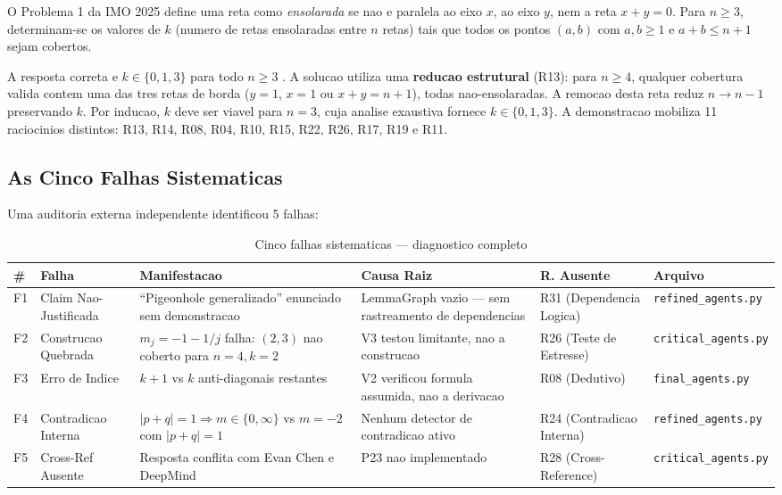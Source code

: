\documentclass[5p]{elsarticle}
\begin{document}
O Problema 1 da IMO 2025 \cite{imo2025} define uma reta como \textit{ensolarada}
se nao e paralela ao eixo $x$, ao eixo $y$, nem a reta $x+y=0$. Para $n\geq 3$,
determinam-se os valores de $k$ (numero de retas ensolaradas entre $n$ retas)
tais que todos os pontos $(a,b)$ com $a,b\geq 1$ e $a+b\leq n+1$ sejam cobertos.

A resposta correta e $k\in\{0,1,3\}$ para todo $n\geq 3$ \cite{chen2025,deepmind2025}.
A solucao utiliza uma \textbf{reducao estrutural} (R13): para $n\geq 4$, qualquer
cobertura valida contem uma das tres retas de borda ($y=1$, $x=1$ ou $x+y=n+1$),
todas nao-ensolaradas. A remocao desta reta reduz $n\to n-1$ preservando $k$.
Por inducao, $k$ deve ser viavel para $n=3$, cuja analise exaustiva fornece
$k\in\{0,1,3\}$. A demonstracao mobiliza 11 raciocinios distintos: R13, R14,
R08, R04, R10, R15, R22, R26, R17, R19 e R11.

\subsection{As Cinco Falhas Sistematicas}

Uma auditoria externa independente \cite{corrigendum2026} identificou 5 falhas:

\begin{landscape}
\begin{table}[H]
  \centering
  \caption{Cinco falhas sistematicas — diagnostico completo}
  \label{tab:f5}
  \small
  \begin{tabular}{p{0.5cm}p{2.5cm}p{3.8cm}p{3.5cm}p{2.5cm}p{2.5cm}}
    \toprule
    \textbf{\#} & \textbf{Falha} & \textbf{Manifestacao} & \textbf{Causa Raiz} & \textbf{R. Ausente} & \textbf{Arquivo} \\
    \midrule
    F1 & Claim Nao-Justificada & ``Pigeonhole generalizado'' enunciado sem demonstracao & LemmaGraph vazio — sem rastreamento de dependencias & R31 (Dependencia Logica) & \texttt{refined\_agents.py} \\
    \rowcolor{yellowbg}
    F2 & Construcao Quebrada & $m_j=-1-1/j$ falha: $(2,3)$ nao coberto para $n=4,k=2$ & V3 testou limitante, nao a construcao & R26 (Teste de Estresse) & \texttt{critical\_agents.py} \\
    F3 & Erro de Indice & $k+1$ vs $k$ anti-diagonais restantes & V2 verificou formula assumida, nao a derivacao & R08 (Dedutivo) & \texttt{final\_agents.py} \\
    \rowcolor{yellowbg}
    F4 & Contradicao Interna & $|p+q|=1\Rightarrow m\in\{0,\infty\}$ vs $m=-2$ com $|p+q|=1$ & Nenhum detector de contradicao ativo & R24 (Contradicao Interna) & \texttt{refined\_agents.py} \\
    F5 & Cross-Ref Ausente & Resposta conflita com Evan Chen e DeepMind & P23 nao implementado & R28 (Cross-Reference) & \texttt{critical\_agents.py} \\
    \bottomrule
  \end{tabular}
\end{table}
\end{landscape}
\end{document}
